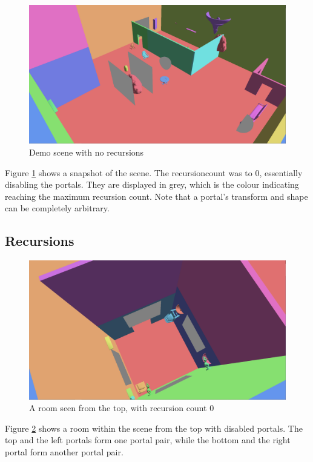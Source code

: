 \begin{figure}[H]
	\centering
	\includegraphics[width=\linewidth]{images/portals.png}
	\caption{Demo scene with no recursions}
	\label{fig:demodisabled}
\end{figure}


Figure \ref{fig:demodisabled} shows a snapshot of the scene. The \gls{recursioncount} was to 0, essentially disabling the portals. They are displayed in grey, which is the colour indicating reaching the maximum recursion count. Note that a portal's transform and shape can be completely arbitrary.

\subsection{Recursions}

\begin{figure}[H]
	\centering
	\includegraphics[width=\linewidth]{images/room.png}
	\caption{A room seen from the top, with recursion count 0}
	\label{fig:roomlayout}
\end{figure}

Figure \ref{fig:roomlayout} shows a room within the scene from the top with disabled portals. The top and the left portals form one portal pair, while the bottom and the right portal form another portal pair.

